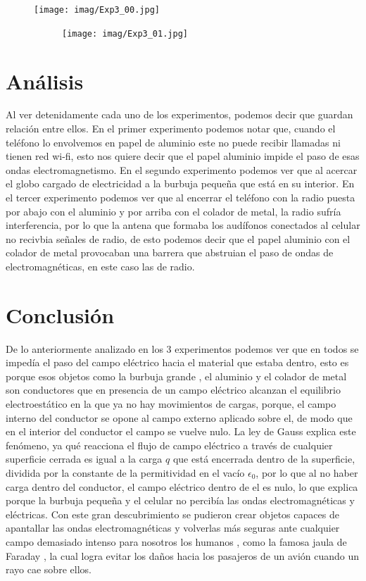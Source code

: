 \documentclass[a4paper,12pt]{article}
\begin{document}
\begin{figure}[h!]
    \begin{subfigure}
        \raggedright
        \texttt{[image: imag/Exp3\_00.jpg]}
    \end{subfigure}
    \begin{subfigure}
        \centering
        \texttt{[image: imag/Exp3\_01.jpg]}
    \end{subfigure}
\end{figure}

\section*{Análisis}
Al ver detenidamente cada uno de los experimentos, podemos decir que guardan relación entre ellos.
En el primer experimento podemos notar que, cuando el teléfono lo envolvemos en papel de aluminio este no puede recibir llamadas ni tienen red wi-fi, esto nos quiere decir que el papel aluminio impide el paso de esas ondas electromagnetismo.
En el segundo experimento podemos ver que al acercar el globo cargado de electricidad a la burbuja pequeña que está en su interior.
En el tercer experimento podemos ver que al encerrar el teléfono con la radio puesta por abajo con el aluminio y por arriba con el colador de metal, la radio sufría interferencia, por lo que la antena que formaba los audífonos conectados al celular no recivbia señales de radio, de esto podemos decir que el papel aluminio con el colador de metal provocaban una barrera que abstruian el paso de ondas de electromagnéticas, en este caso las de radio.


\section*{Conclusión}
De lo anteriormente analizado en los 3 experimentos podemos ver que en todos se impedía el paso del campo eléctrico hacia el material que estaba dentro, esto es porque esos objetos como la burbuja grande , el aluminio y el colador de metal son conductores que en presencia de un campo eléctrico alcanzan el equilibrio electroestático en la que ya no hay movimientos de cargas, porque, el campo interno del conductor se opone al campo externo aplicado sobre el, de modo que en el interior del conductor el campo se vuelve nulo.
La ley de Gauss explica este fenómeno, ya qué reacciona el flujo de campo eléctrico a través de cualquier superficie cerrada es igual a la carga $q$ que está encerrada dentro de la superficie, dividida por la constante de la permitividad en el vacío $\epsilon_0$, por lo que al no haber carga dentro del conductor, el campo eléctrico dentro de el es nulo, lo que explica porque la burbuja pequeña y el celular no percibía las ondas electromagnéticas y eléctricas.
Con este gran descubrimiento se pudieron crear objetos capaces de apantallar las ondas electromagnéticas y volverlas más seguras ante cualquier campo demasiado intenso para nosotros los humanos , como la famosa jaula de Faraday , la cual logra evitar los daños hacia los pasajeros de un avión cuando un rayo cae sobre ellos.

\end{document}

